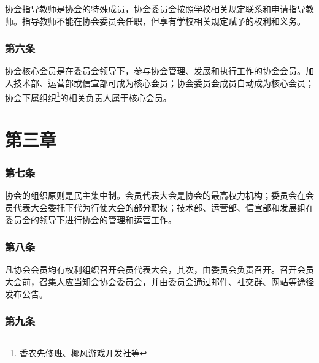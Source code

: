 \documentclass[
]{ctexart}
\begin{document}
协会指导教师是协会的特殊成员，协会委员会按照学校相关规定联系和申请指导教师。指导教师不能在协会委员会任职，但享有学校相关规定赋予的权利和义务。

\hypertarget{ux7b2cux516dux6761-ux6838ux5fc3ux4f1aux5458}{%
\subsubsection{第六条}\label{ux7b2cux516dux6761-ux6838ux5fc3ux4f1aux5458}}

协会核心会员是在委员会领导下，参与协会管理、发展和执行工作的协会会员。加入技术部、运营部或信宣部可成为核心会员；协会委员会成员自动成为核心会员；协会下属组织\footnote{香农先修班、椰风游戏开发社等}的相关负责人属于核心会员。

\hypertarget{ux7b2cux4e09ux7ae0-ux7ec4ux7ec7ux4e0eux7ba1ux7406}{%
\section{第三章}\label{ux7b2cux4e09ux7ae0-ux7ec4ux7ec7ux4e0eux7ba1ux7406}}

\hypertarget{ux7b2cux4e03ux6761-ux7ba1ux7406ux5236ux5ea6}{%
\subsubsection{第七条}\label{ux7b2cux4e03ux6761-ux7ba1ux7406ux5236ux5ea6}}

协会的组织原则是民主集中制。会员代表大会是协会的最高权力机构；委员会在会员代表大会委托下代为行使大会的部分职权；技术部、运营部、信宣部和发展组在委员会的领导下进行协会的管理和运营工作。

\hypertarget{ux7b2cux516bux6761-ux4f1aux5458ux4ee3ux8868ux5927ux4f1a}{%
\subsubsection{第八条}\label{ux7b2cux516bux6761-ux4f1aux5458ux4ee3ux8868ux5927ux4f1a}}

凡协会会员均有权利组织召开会员代表大会，其次，由委员会负责召开。召开会员大会前，召集人应当知会协会委员会，并由委员会通过邮件、社交群、网站等途径发布公告。

\hypertarget{ux7b2cux4e5dux6761-ux53ecux5f00ux5927ux4f1aux7684ux8981ux6c42}{%
\subsubsection{第九条}\label{ux7b2cux4e5dux6761-ux53ecux5f00ux5927ux4f1aux7684ux8981ux6c42}}
\end{document}
